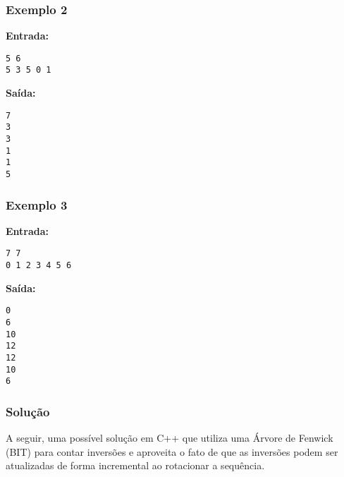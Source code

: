 \subsubsection*{Exemplo 2}
\textbf{Entrada:}
\begin{verbatim}
5 6
5 3 5 0 1
\end{verbatim}
\textbf{Saída:}
\begin{verbatim}
7
3
3
1
1
5
\end{verbatim}

\subsubsection*{Exemplo 3}
\textbf{Entrada:}
\begin{verbatim}
7 7
0 1 2 3 4 5 6
\end{verbatim}
\textbf{Saída:}
\begin{verbatim}
0
6
10
12
12
10
6
\end{verbatim}

\subsubsection*{Solução}
A seguir, uma possível solução em C++ que utiliza uma Árvore de Fenwick (BIT) para contar inversões e aproveita o fato de que as inversões podem ser atualizadas de forma incremental ao rotacionar a sequência.

